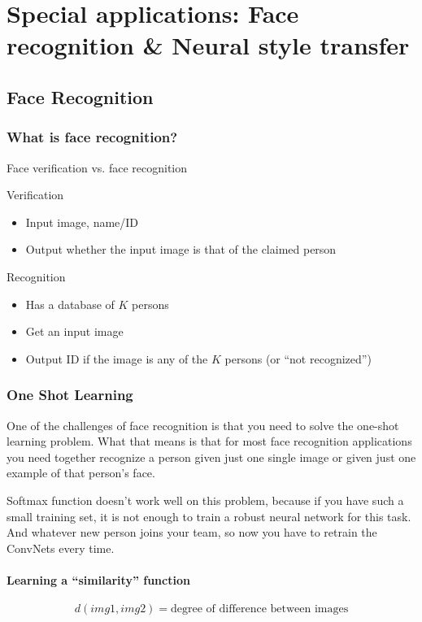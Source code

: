 \documentclass[UTF8]{article}
\begin{document}
\section{Special applications: Face recognition \& Neural style transfer}
\subsection{Face Recognition}
\subsubsection{What is face recognition?}
Face verification vs. face recognition

Verification
\begin{itemize}
    \item Input image, name/ID
    \item Output whether the input image is that of the claimed person
\end{itemize}

Recognition
\begin{itemize}
    \item Has a database of $K$ persons
    \item Get an input image
    \item Output ID if the image is any of the $K$ persons (or ``not recognized'')
\end{itemize}

\subsubsection{One Shot Learning}
One of the challenges of face recognition is that you need to solve the one-shot learning problem.
What that means is that for most face recognition applications you need together recognize a person
given just one single image or given just one example of that person's face.

Softmax function doesn't work well on this problem, because if you have such a small training set,
it is not enough to train a robust neural network for this task. And whatever new person joins your
team, so now you have to retrain the ConvNets every time.

\paragraph{Learning a ``similarity'' function}
$$ d(img1, img2) = \text{degree of difference between images} $$
\end{document}
